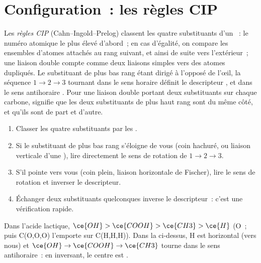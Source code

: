\section{Configuration~: les règles CIP}

\begin{definition}\label{def:b1:stereochemistry-in-depth:cip}
Les \emph{règles CIP} (Cahn--Ingold--Prelog) classent les
quatre substituants d'un ~: le numéro atomique le plus
élevé d'abord~; en cas d'égalité, on compare les ensembles d'atomes
attachés au rang suivant, et ainsi de suite vers l'extérieur~; une
liaison double compte comme deux liaisons simples vers des atomes
dupliqués. Le substituant de plus bas rang étant dirigé à l'opposé de
l'œil, la séquence
$1 \to 2 \to 3$ tournant dans le sens horaire définit le descripteur
, et dans le sens antihoraire . Pour une liaison double
portant deux substituants sur chaque carbone,  signifie que les
deux substituants de plus haut rang sont du même côté, et  qu'ils
sont de part et d'autre.
\end{definition}

\begin{method}\label{met:b1:stereochemistry-in-depth:cip}
\begin{enumerate}
  \item Classer les quatre substituants par les .
  \item Si le substituant de plus bas rang s'éloigne de vous (coin
        hachuré, ou liaison verticale d'une ), lire
        directement le sens de rotation de $1 \to 2 \to 3$.
  \item S'il pointe vers vous (coin plein, liaison horizontale de
        Fischer), lire le sens de rotation et inverser le descripteur.
  \item Échanger deux substituants quelconques inverse le descripteur~:
        c'est une vérification rapide.
\end{enumerate}
Dans l'acide lactique, $\ce{OH} > \ce{COOH} > \ce{CH3} > \ce{H}$ (O~;
puis C(O,O,O) l'emporte sur C(H,H,H)). Dans la 
ci-dessus, H est horizontal (vers nous) et
$\ce{OH} \to \ce{COOH} \to \ce{CH3}$ tourne dans le sens antihoraire~:
en inversant, le centre est .
\end{method}

